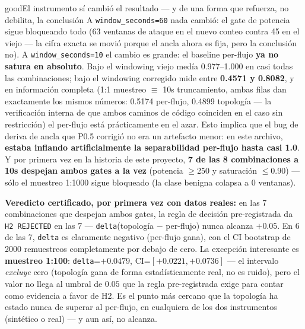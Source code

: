 \documentclass[11pt]{article}
\newcommand{\code}[1]{\texttt{\small #1}}
\begin{document}
\begin{cbox}{good}{El instrumento sí cambió el resultado --- y de una forma que refuerza, no debilita, la conclusión}
A \code{window\_seconds=60} nada cambió: el gate de potencia sigue bloqueando todo (63 ventanas de
ataque en el nuevo conteo contra 45 en el viejo --- la cifra exacta se movió porque el ancla ahora
es fija, pero la conclusión no). A \code{window\_seconds=10} el cambio es grande: el baseline
per-flujo \textbf{ya no satura en absoluto}. Bajo el windowing viejo medía 0.977--1.000 en casi
todas las combinaciones; bajo el windowing corregido mide entre \textbf{0.4571 y 0.8082}, y en
información completa (1:1 muestreo $\equiv$ 10s truncamiento, ambas filas dan exactamente los
mismos números: 0.5174 per-flujo, 0.4899 topología --- la verificación interna de que ambos caminos
de código coinciden en el caso sin restricción) el per-flujo está prácticamente en el azar. Esto
implica que el bug de deriva de ancla que P0.5 corrigió no era un artefacto menor: en este archivo,
\textbf{estaba inflando artificialmente la separabilidad per-flujo hasta casi 1.0}. Y por primera
vez en la historia de este proyecto, \textbf{7 de las 8 combinaciones a 10s despejan ambos gates a
la vez} (potencia $\geq$250 y saturación $\leq$0.90) --- sólo el muestreo 1:1000 sigue bloqueado
(la clase benigna colapsa a 0 ventanas).
\end{cbox}

\textbf{Veredicto certificado, por primera vez con datos reales:} en las 7 combinaciones que
despejan ambos gates, la regla de decisión pre-registrada da \code{H2 REJECTED} en las 7 ---
\texttt{delta}(topología $-$ per-flujo) nunca alcanza $+0.05$. En 6 de las 7, \texttt{delta} es
claramente negativo (per-flujo gana), con el CI bootstrap de 2000 remuestreos completamente por
debajo de cero. La excepción interesante es \textbf{muestreo 1:100}: \texttt{delta}=$+0.0479$,
CI=$[+0.0221, +0.0736]$ --- el intervalo \emph{excluye} cero (topología gana de forma
estadísticamente real, no es ruido), pero el valor no llega al umbral de $0.05$ que la regla
pre-registrada exige para contar como evidencia a favor de H2. Es el punto más cercano que la
topología ha estado nunca de superar al per-flujo, en cualquiera de los dos instrumentos
(sintético o real) --- y aun así, no alcanza.
\end{document}
